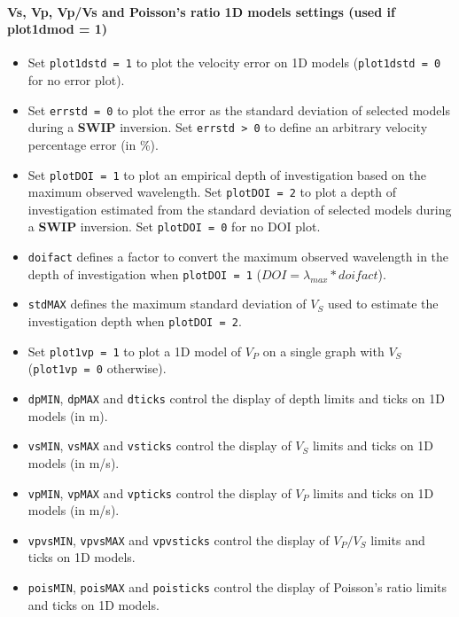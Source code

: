 \documentclass[twoside,a4paper]{article}
\def\SWIP{\textbf{SWIP}}
\begin{document}
\paragraph{Vs, Vp, Vp/Vs and Poisson's ratio 1D models settings (used if plot1dmod = 1)}
\begin{itemize}[leftmargin=*]
\setlength\itemsep{2ex}
\item Set \verb|plot1dstd = 1| to plot the velocity error on 1D models (\verb|plot1dstd = 0| for no error plot).

\item Set \verb|errstd = 0| to plot the error as the standard deviation of selected models during a {\SWIP} inversion. Set \verb|errstd > 0| to define an arbitrary velocity percentage error (in \%).

\item Set \verb|plotDOI = 1| to plot an empirical depth of investigation based on the maximum observed wavelength. Set \verb|plotDOI = 2| to plot a depth of investigation estimated from the standard deviation of selected models during a {\SWIP} inversion. Set \verb|plotDOI = 0| for no DOI plot.

\item \verb|doifact| defines a factor to convert the maximum observed wavelength in the depth of investigation when \verb|plotDOI = 1| ($DOI = \lambda_{max}*doifact$).

\item \verb|stdMAX| defines the maximum standard deviation of $V_S$ used to estimate the investigation depth when \verb|plotDOI = 2|.

\item Set \verb|plot1vp = 1| to plot a 1D model of $V_P$ on a single graph with $V_S$ (\verb|plot1vp = 0| otherwise).\\[2ex]

\item \verb|dpMIN|, \verb|dpMAX| and \verb|dticks| control the display of depth limits and ticks on 1D models (in m).

\item \verb|vsMIN|, \verb|vsMAX| and \verb|vsticks| control the display of $V_S$ limits and ticks on 1D models (in m/s).

\item \verb|vpMIN|, \verb|vpMAX| and \verb|vpticks| control the display of $V_P$ limits and ticks on 1D models (in m/s).

\item \verb|vpvsMIN|, \verb|vpvsMAX| and \verb|vpvsticks| control the display of $V_P/V_S$ limits and ticks on 1D models.

\item \verb|poisMIN|, \verb|poisMAX| and \verb|poisticks| control the display of Poisson's ratio limits and ticks on 1D models.
\end{itemize}
\end{document}
